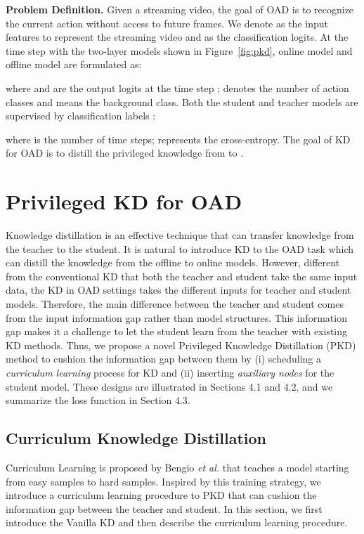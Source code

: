 \documentclass[final]{cvpr}
\begin{document}
\noindent \textbf{Problem Definition.} Given a streaming video, the goal of OAD is to recognize the current action without access to future frames.
We denote  as the input features to represent the streaming video and  as the classification logits. At the time step  with the two-layer models shown in Figure~\ref{fig:pkd}, online model  and offline model  are formulated as:

where  and  are the output logits at the time step ;  denotes the number of action classes and  means the background class. Both the student and teacher models are supervised by classification labels :

where  is the number of time steps;  represents the cross-entropy. The goal of KD for OAD is to distill the privileged knowledge from  to .



\section{Privileged KD for OAD}

Knowledge distillation is an effective technique that can transfer knowledge from the teacher to the student. It is natural to introduce KD to the OAD task which can distill the knowledge from the offline to online models. However, different from the conventional KD that both the teacher and student take the same input data, the KD in OAD settings takes the different inputs for teacher and student models. Therefore, the main difference between the teacher and student comes from the input information gap rather than model structures. This information gap makes it a challenge to let the student learn from the teacher with existing KD methods. Thus, we propose a novel Privileged Knowledge Distillation (PKD) method to cushion the information gap between them by (i) scheduling a \emph{curriculum learning} process for KD and (ii) inserting \emph{auxiliary nodes} for the student model. These designs are illustrated in Sections 4.1 and 4.2, and we summarize the loss function in Section 4.3.


\subsection{Curriculum Knowledge Distillation}

Curriculum Learning \cite{bengio2009curriculum} is proposed by Bengio \emph{et al.} that teaches a model starting from easy samples to hard samples. Inspired by this training strategy, we introduce a curriculum learning procedure to PKD that can cushion the information gap between the teacher and student. In this section, we first introduce the Vanilla KD and then describe the curriculum learning procedure.
\end{document}

